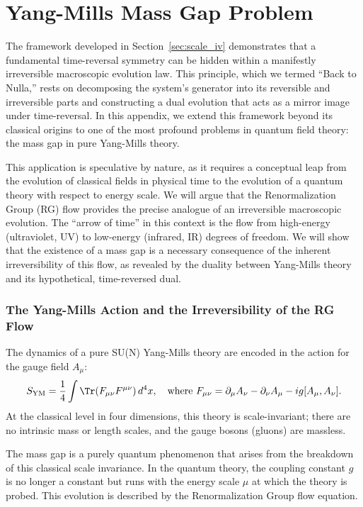 \section{Yang-Mills Mass Gap Problem}
\label{app:yang_mills}

The framework developed in Section~\ref{sec:scale_iv} demonstrates that a fundamental time-reversal symmetry can be hidden within a manifestly irreversible macroscopic evolution law. This principle, which we termed ``Back to Nulla,'' rests on decomposing the system's generator into its reversible and irreversible parts and constructing a dual evolution that acts as a mirror image under time-reversal. In this appendix, we extend this framework beyond its classical origins to one of the most profound problems in quantum field theory: the mass gap in pure Yang-Mills theory.

This application is speculative by nature, as it requires a conceptual leap from the evolution of classical fields in physical time to the evolution of a quantum theory with respect to energy scale. We will argue that the Renormalization Group (RG) flow provides the precise analogue of an irreversible macroscopic evolution. The ``arrow of time'' in this context is the flow from high-energy (ultraviolet, UV) to low-energy (infrared, IR) degrees of freedom. We will show that the existence of a mass gap is a necessary consequence of the inherent irreversibility of this flow, as revealed by the duality between Yang-Mills theory and its hypothetical, time-reversed dual.

\subsubsection{The Yang-Mills Action and the Irreversibility of the RG Flow}
The dynamics of a pure SU(N) Yang-Mills theory are encoded in the action for the gauge field $A_\mu$:
\begin{equation}
    S_{\text{YM}} = \frac{1}{4} \int \Tr(F_{\mu\nu} F^{\mu\nu}) \, d^4x, \quad \text{where } F_{\mu\nu} = \partial_\mu A_\nu - \partial_\nu A_\mu - ig[A_\mu, A_\nu].
\end{equation}
At the classical level in four dimensions, this theory is scale-invariant; there are no intrinsic mass or length scales, and the gauge bosons (gluons) are massless.

The mass gap is a purely quantum phenomenon that arises from the breakdown of this classical scale invariance. In the quantum theory, the coupling constant $g$ is no longer a constant but runs with the energy scale $\mu$ at which the theory is probed. This evolution is described by the Renormalization Group flow equation.

